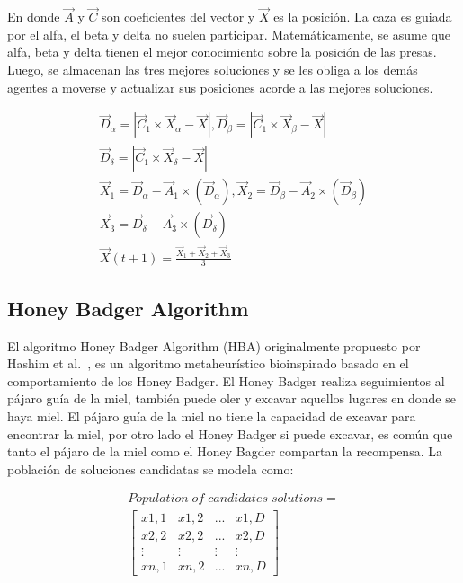 \documentclass[conference]{IEEEtran}
\begin{document}
En donde $\vec{A}$ y $\vec{C}$ son coeficientes del vector y $\vec{X}$ es la posición. La caza es guiada por el alfa, el beta y delta no suelen participar. Matemáticamente, se asume que alfa, beta y delta tienen el mejor conocimiento sobre la posición de las presas. Luego, se almacenan las tres mejores soluciones y se les obliga a los demás agentes a moverse y actualizar sus posiciones acorde a las mejores soluciones.


\begin{equation}
\begin{gathered}
\vec{D}_{\alpha} = |\vec{C}_1 \times \vec{X}_{\alpha} -\vec{X}|, \vec{D}_{\beta} = |\vec{C}_1 \times \vec{X}_{\beta} -\vec{X}| \\
\vec{D}_{\delta} = |\vec{C}_1 \times \vec{X}_{\delta} -\vec{X}|\\
\vec{X}_1=\vec{D}_{\alpha}-\vec{A}_1 \times (\vec{D}_{\alpha}), \vec{X}_2=\vec{D}_{\beta}-\vec{A}_2 \times (\vec{D}_{\beta})\\
\vec{X}_3=\vec{D}_{\delta}-\vec{A}_3 \times (\vec{D}_{\delta}) \\
\vec{X}(t+1) = \frac{\vec{X}_1+\vec{X}_2+\vec{X}_3}{3}
\end{gathered}
\label{eq26}
\end{equation}


\subsection{Honey Badger Algorithm}

El algoritmo Honey Badger Algorithm (HBA) originalmente propuesto por Hashim et al.~\cite{Hashim2022}, es un algoritmo metaheurístico bioinspirado basado en el comportamiento de los Honey Badger. El Honey Badger realiza seguimientos al pájaro guía de la miel, también puede oler y excavar aquellos lugares en donde se haya miel. El pájaro guía de la miel no tiene la capacidad de excavar para encontrar la miel, por otro lado el Honey Badger si puede excavar, es común que tanto el pájaro de la miel como el Honey Bagder compartan la recompensa. La población de soluciones candidatas se modela como:

\begin{equation}
\begin{gathered}
Population \;of\; candidates\; solutions=\\\begin{bmatrix}
  x1,1 & x1,2 & ... & x1,D  \\
  x2,2 & x2,2 & ... & x2,D  \\
  \vdots & \vdots & \vdots & \vdots \\
  xn,1 & xn,2 & ... & xn,D
\end{bmatrix}
\end{gathered}
\label{eq27}
\end{equation}
\end{document}
